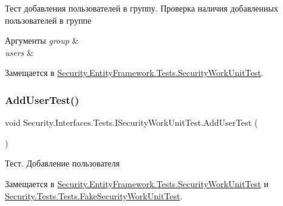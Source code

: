 Тест добавления пользователей в группу. Проверка наличия добавленных пользователей в группе 


\begin{DoxyParams}{Аргументы}
{\em group} & \\
\hline
{\em users} & \\
\hline
\end{DoxyParams}


Замещается в \hyperlink{class_security_1_1_entity_framework_1_1_tests_1_1_security_work_unit_test_a0a1658e7f72c000876c020c3678b3390}{Security.\+Entity\+Framework.\+Tests.\+Security\+Work\+Unit\+Test}.

\mbox{\label{interface_security_1_1_interfaces_1_1_tests_1_1_i_security_work_unit_test_a969a286db947dd1c12577403eabfd259}} 
\subsubsection{\texorpdfstring{Add\+User\+Test()}{AddUserTest()}}
{\footnotesize\ttfamily void Security.\+Interfaces.\+Tests.\+I\+Security\+Work\+Unit\+Test.\+Add\+User\+Test (\begin{DoxyParamCaption}{ }\end{DoxyParamCaption})}



Тест. Добавление пользователя 



Замещается в \hyperlink{class_security_1_1_entity_framework_1_1_tests_1_1_security_work_unit_test_a345165033253ee250c135dd233ee5742}{Security.\+Entity\+Framework.\+Tests.\+Security\+Work\+Unit\+Test} и \hyperlink{class_security_1_1_tests_1_1_tests_1_1_fake_security_work_unit_test_a3108e9b07d660d28e7c058404afdcfaf}{Security.\+Tests.\+Tests.\+Fake\+Security\+Work\+Unit\+Test}.

\mbox{\label{interface_security_1_1_interfaces_1_1_tests_1_1_i_security_work_unit_test_a194b8dd16cd9598c984793f6e72c11a3}} 
